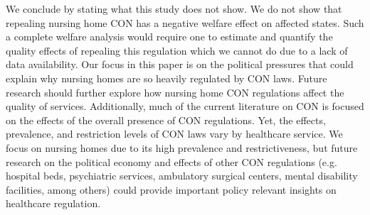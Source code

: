 \documentclass[../Main.tex]{subfiles}
\begin{document}
We conclude by stating what this study does not show. We do not show that repealing nursing home CON has a negative welfare effect on affected states. Such a complete welfare analysis would require one to estimate and quantify the quality effects of repealing this regulation which we cannot do due to a lack of data availability. Our focus in this paper is on the political pressures that could explain why nursing homes are so heavily regulated by CON laws. Future research should further explore how nursing home CON regulations affect the quality of services. Additionally, much of the current literature on CON is focused on the effects of the overall presence of CON regulations. Yet, the effects, prevalence, and restriction levels of CON laws vary by healthcare service. We focus on nursing homes due to its high prevalence and restrictiveness, but future research on the political economy and effects of other CON regulations (e.g. hospital beds, psychiatric services, ambulatory surgical centers, mental disability facilities, among others) could provide important policy relevant insights on healthcare regulation. 
\end{document}
